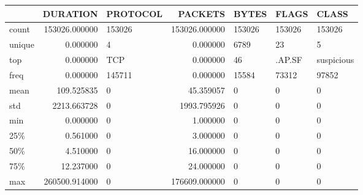 \begin{tabular}{lrlrlll}
\toprule
{} &       DURATION & PROTOCOL &        PACKETS &     BYTES &   FLAGS &       CLASS \\
\midrule
count  &  153026.000000 &   153026 &  153026.000000 &    153026 &  153026 &      153026 \\
unique &       0.000000 &        4 &       0.000000 &      6789 &      23 &           5 \\
top    &       0.000000 &    TCP   &       0.000000 &        46 &  .AP.SF &  suspicious \\
freq   &       0.000000 &   145711 &       0.000000 &     15584 &   73312 &       97852 \\
mean   &     109.525835 &        0 &      45.359057 &         0 &       0 &           0 \\
std    &    2213.663728 &        0 &    1993.795926 &         0 &       0 &           0 \\
min    &       0.000000 &        0 &       1.000000 &         0 &       0 &           0 \\
25\%    &       0.561000 &        0 &       3.000000 &         0 &       0 &           0 \\
50\%    &       4.510000 &        0 &      16.000000 &         0 &       0 &           0 \\
75\%    &      12.237000 &        0 &      24.000000 &         0 &       0 &           0 \\
max    &  260500.914000 &        0 &  176609.000000 &         0 &       0 &           0 \\
\bottomrule
\end{tabular}
